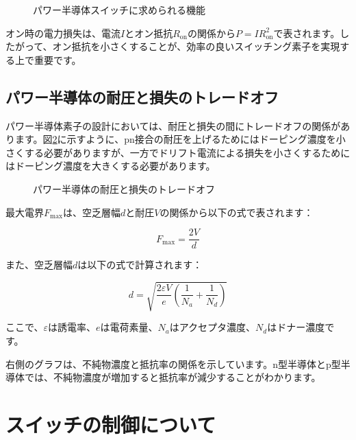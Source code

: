 \begin{figure}[H]
\centering
{}
\caption{パワー半導体スイッチに求められる機能}
\label{fig:requirements}
\end{figure}

オン時の電力損失は、電流$I$とオン抵抗$R_{\text{on}}$の関係から$P = IR_{\text{on}}^2$で表されます。したがって、オン抵抗を小さくすることが、効率の良いスイッチング素子を実現する上で重要です。

\subsection{パワー半導体の耐圧と損失のトレードオフ}

パワー半導体素子の設計においては、耐圧と損失の間にトレードオフの関係があります。図\ref{fig:tradeoff}に示すように、pn接合の耐圧を上げるためにはドーピング濃度を小さくする必要がありますが、一方でドリフト電流による損失を小さくするためにはドーピング濃度を大きくする必要があります。

\begin{figure}[H]
\centering
{}
\caption{パワー半導体の耐圧と損失のトレードオフ}
\label{fig:tradeoff}
\end{figure}

最大電界$F_{\text{max}}$は、空乏層幅$d$と耐圧$V$の関係から以下の式で表されます：

\begin{equation}
F_{\text{max}} = \frac{2V}{d}
\end{equation}

また、空乏層幅$d$は以下の式で計算されます：

\begin{equation}
d = \sqrt{\frac{2\varepsilon V}{e}\left(\frac{1}{N_a} + \frac{1}{N_d}\right)}
\end{equation}

ここで、$\varepsilon$は誘電率、$e$は電荷素量、$N_a$はアクセプタ濃度、$N_d$はドナー濃度です。

右側のグラフは、不純物濃度と抵抗率の関係を示しています。n型半導体とp型半導体では、不純物濃度が増加すると抵抗率が減少することがわかります。

\section{スイッチの制御について}

